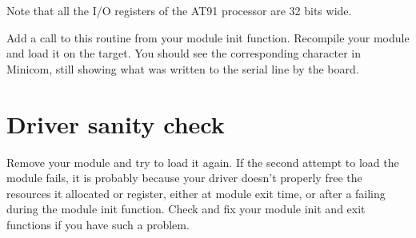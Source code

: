 Note that all the I/O registers of the AT91 processor are 32 bits
wide.

Add a call to this routine from your module init function. Recompile
your module and load it on the target. You should see the
corresponding character in Minicom, still showing what was written to
the serial line by the board.

\section{Driver sanity check}

Remove your module and try to load it again. If the second attempt to
load the module fails, it is probably because your driver doesn't
properly free the resources it allocated or register, either at module
exit time, or after a failing during the module init function.  Check
and fix your module init and exit functions if you have such a
problem.

